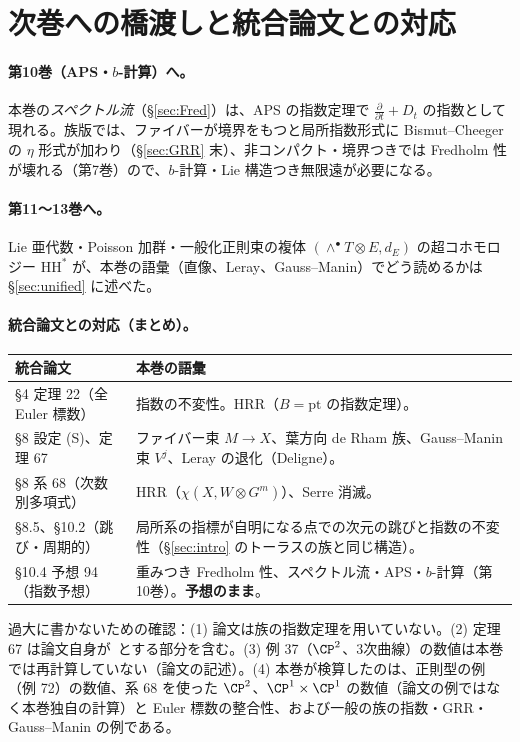 \section{次巻への橋渡しと統合論文との対応}\label{sec:bridge}
\paragraph{第10巻（APS・$b$-計算）へ。}本巻の\emph{スペクトル流}（\S\ref{sec:Fred}）は、APS の指数定理で $\frac\partial{\partial t}+D_t$ の指数として現れる。族版では、ファイバーが境界をもつと局所指数形式に Bismut--Cheeger の $\eta$ 形式が加わり（\S\ref{sec:GRR} 末）、非コンパクト・境界つきでは Fredholm 性が壊れる（第7巻）ので、$b$-計算・Lie 構造つき無限遠が必要になる。
\paragraph{第11〜13巻へ。}Lie 亜代数・Poisson 加群・一般化正則束の複体 $(\wedge^\bullet T\otimes E,d_E)$ の超コホモロジー $\mathrm{HH}^*$ が、本巻の語彙（直像、Leray、Gauss--Manin）でどう読めるかは \S\ref{sec:unified} に述べた。
\paragraph{統合論文との対応（まとめ）。}
\begin{center}
\renewcommand{\arraystretch}{1.2}
\begin{tabular}{>{\raggedright\arraybackslash}p{4.8cm}>{\raggedright\arraybackslash}p{9cm}}
\toprule
統合論文 & 本巻の語彙\\
\midrule
\S4 定理 22（全 Euler 標数） & 指数の不変性。HRR（$B=\mathrm{pt}$ の指数定理）。\\
\S8 設定 (S)、定理 67 & ファイバー束 $M\to X$、葉方向 de Rham 族、Gauss--Manin 束 $V^j$、Leray の退化（Deligne）。\\
\S8 系 68（次数別多項式） & HRR（$\chi(X,W\otimes G^m)$）、Serre 消滅。\\
\S8.5、\S10.2（跳び・周期的） & 局所系の指標が自明になる点での次元の跳びと指数の不変性（\S\ref{sec:intro} のトーラスの族と同じ構造）。\\
\S10.4 予想 94（指数予想） & 重みつき Fredholm 性、スペクトル流・APS・$b$-計算（第10巻）。\textbf{予想のまま}。\\
\bottomrule
\end{tabular}
\end{center}
過大に書かないための確認：(1) 論文は族の指数定理を用いていない。(2) 定理 67 は論文自身が\tQ\ とする部分を含む。(3) 例 37（$\CP^2$、3次曲線）の数値は本巻では再計算していない（論文の記述）。(4) 本巻が検算したのは、正則型の例（例 72）の数値、系 68 を使った $\CP^2$、$\CP^1\times\CP^1$ の数値（論文の例ではなく本巻独自の計算）と Euler 標数の整合性、および一般の族の指数・GRR・Gauss--Manin の例である。

